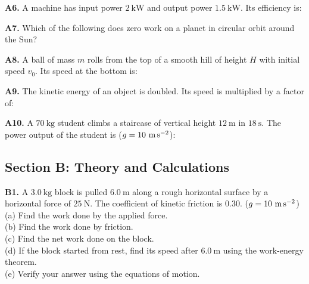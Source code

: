 \begin{exercisebox}[5]
\vspace{0.4cm}

\textbf{A6.} A machine has input power $2\ \text{kW}$
and output power $1.5\ \text{kW}$. Its efficiency is:


\vspace{0.4cm}

\textbf{A7.} Which of the following does zero work
on a planet in circular orbit around the Sun?


\vspace{0.4cm}

\textbf{A8.} A ball of mass $m$ rolls from the top of
a smooth hill of height $H$ with initial speed $v_0$.
Its speed at the bottom is:


\vspace{0.4cm}

\textbf{A9.} The kinetic energy of an object is
doubled. Its speed is multiplied by a factor of:


\vspace{0.4cm}

\textbf{A10.} A $70\ \text{kg}$ student climbs a
staircase of vertical height $12\ \text{m}$ in
$18\ \text{s}$. The power output of the student is
($g = 10\ \text{m\,s}^{-2}$):


\vspace{0.6cm}

\subsection*{Section B: Theory and Calculations}

\textbf{B1.} A $3.0\ \text{kg}$ block is pulled
$6.0\ \text{m}$ along a rough horizontal surface
by a horizontal force of $25\ \text{N}$. The
coefficient of kinetic friction is $0.30$.
($g = 10\ \text{m\,s}^{-2}$)\\[4pt]
(a) Find the work done by the applied force.\\
(b) Find the work done by friction.\\
(c) Find the net work done on the block.\\
(d) If the block started from rest, find its speed
after $6.0\ \text{m}$ using the work-energy theorem.\\
(e) Verify your answer using the equations of motion.
\hfill{}


\end{exercisebox}
